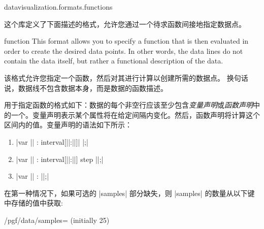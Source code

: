 \begin{tikzlibrary}{datavisualization.formats.functions}

    这个库定义了下面描述的格式，允许您通过一个待求函数间接地指定数据点。

    \begin{dataformat}{function}
        This format allows you to specify a function that is then evaluated in order to create the desired data points. In other words, the data lines do not contain the data itself, but rather a functional description of the data.

        该格式允许您指定一个函数，然后对其进行计算以创建所需的数据点。 换句话说，数据线不包含数据本身，而是数据的函数描述。


        用于指定函数的格式如下：数据的每个非空行应该至少包含\emph{变量声明}或\emph{函数声明}中的一个。变量声明表示某个属性将在给定间隔内变化。然后，函数声明将计算这个区间内的值。变量声明的语法如下所示：
        \begin{enumerate}
            \item |var || : interval[||:||]| |;|
            \item |var || : interval[||:||] step ||;|
            \item |var || : {||};|
        \end{enumerate}
        在第一种情况下，如果可选的 |samples| 部分缺失，则 |samples| 的数量从以下键中存储的值中获取:
        \begin{key}{/pgf/data/samples= (initially 25)} %


\end{key}
\end{dataformat}
\end{tikzlibrary}
